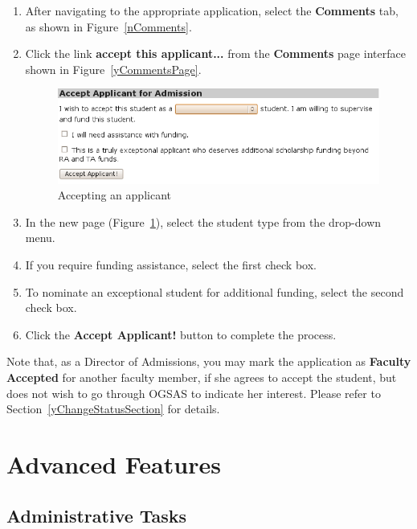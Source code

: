 \documentclass[titlepage]{article}
\begin{document}
\begin{enumerate}
\item After navigating to the appropriate application, select the
  \textbf{\textsf{Comments}} tab, as shown in Figure~\ref{nComments}.
\item Click the link \textbf{\textsf{accept this applicant...}} from the
  \textbf{\textsf{Comments}} page interface shown in Figure~\ref{yCommentsPage}.

\begin{figure}[h!]
  \begin{center}
    \includegraphics[width=13cm]{acceptpage.png}
  \end{center}
  \caption{Accepting an applicant}
  \label{yAcceptPage}
\end{figure}

\item In the new page (Figure~\ref{yAcceptPage}), select the student type from
  the drop-down menu.
\item If you require funding assistance, select the first check box.
\item To nominate an exceptional student for additional funding, select the
  second check box.
\item Click the \textbf{\textsf{Accept Applicant!}} button to complete the process.
\end{enumerate}

Note that, as a Director of Admissions, you may mark the application as
\textbf{\textsf{Faculty Accepted}} for another faculty member, if she agrees to
accept the student, but does not wish to go through OGSAS to indicate her
interest. Please refer to Section~\ref{yChangeStatusSection} for details.

\newpage
\section{Advanced Features}
\label{tAdvanced}
\setcounter{figure}{0}

\subsection{Administrative Tasks}
\end{document}
